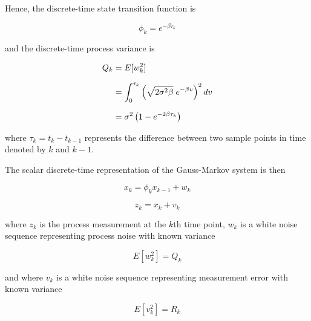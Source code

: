 \documentclass[12pt]{article}
\begin{document}
Hence, the discrete-time state transition function is

\begin{equation}
    \phi_k = e^{-\beta \tau_k}
    \label{eq:GM-state-transition}
\end{equation}

and the discrete-time process variance is

\begin{equation}
    \setlength{\jot}{10pt}
    \begin{aligned}
    Q_k &= E[w_k^2] \\
        &= \int_0^{\tau_k} \left ( \sqrt{2 \sigma^2 \beta} \; e^{- \beta v} \right ) ^ 2 dv \\
        &= \sigma^2 \left ( 1 - e^{-2 \beta \tau_k} \right )
    \end{aligned}
    \label{eq:GM-process-variance}
\end{equation}

where $\tau_k = t_k - t_{k-1}$ represents the difference between two sample points in time
denoted by $k$ and $k - 1$.

The scalar discrete-time representation of the Gauss-Markov system is then

\begin{equation}
    x_k = \phi_k x_{k-1} + w_k
    \label{eq:GM-discrete-state-equation}
\end{equation}

\begin{equation}
    z_k = x_{k} + v_k
    \label{eq:GM-discrete-measurement-equation}
\end{equation}

where $z_k$ is the process measurement at the $k$th time point, $w_k$ is a white noise
sequence representing process noise with known variance

\begin{equation}
    E[w_k^2] = Q_k
    \label{eq:GM-discrete-process-variance}
\end{equation}

and where $v_k$ is a white noise sequence representing measurement error with known
variance

\begin{equation}
    E[v_k^2] = R_k
    \label{eq:GM-discrete-measurement-variance}
\end{equation}



%
%
\end{document}
